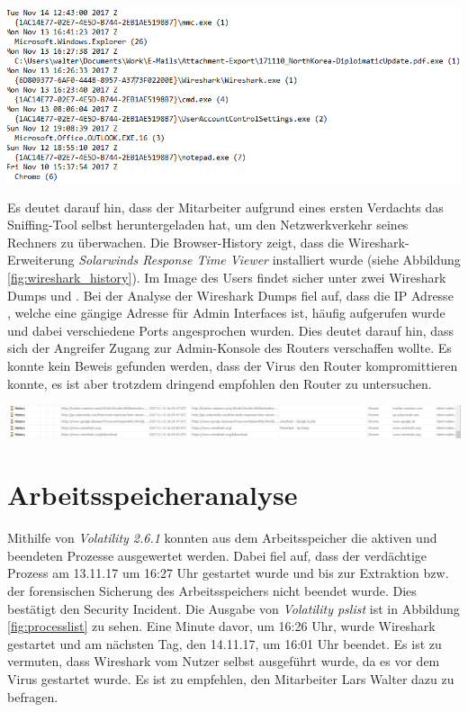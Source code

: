 \begin{center}
	\includegraphics[width=15.8cm]{figures/wireshark_paths.png}
	\label{fig:wireshark_paths}
\end{center}

Es deutet darauf hin, dass der Mitarbeiter aufgrund eines ersten Verdachts das Sniffing-Tool selbst heruntergeladen hat, um den Netzwerkverkehr seines Rechners zu überwachen.
Die Browser-History zeigt, dass die Wireshark-Erweiterung \textit{Solarwinds Response Time Viewer} installiert wurde (siehe Abbildung \ref{fig:wireshark_history}).
Im Image des Users findet sicher unter  zwei Wireshark Dumps  und .
Bei der Analyse der Wireshark Dumps fiel auf, dass die IP Adresse , welche eine gängige Adresse für Admin Interfaces ist, häufig aufgerufen wurde und dabei verschiedene Ports angesprochen wurden.
Dies deutet darauf hin, dass sich der Angreifer Zugang zur Admin-Konsole des Routers verschaffen wollte.
Es konnte kein Beweis gefunden werden, dass der Virus den Router kompromittieren konnte, es ist aber trotzdem dringend empfohlen den Router zu untersuchen.

\begin{center}
	\includegraphics[width=15.8cm]{figures/wireshark_history.PNG}
	\label{fig:wireshark_history}
\end{center}

\section{Arbeitsspeicheranalyse}
Mithilfe von \textit{Volatility 2.6.1} konnten aus dem Arbeitsspeicher die aktiven und beendeten Prozesse ausgewertet werden.
Dabei fiel auf, dass der verdächtige Prozess  am 13.11.17 um 16:27 Uhr gestartet wurde und bis zur Extraktion bzw. der forensischen Sicherung des Arbeitsspeichers nicht beendet wurde.
Dies bestätigt den Security Incident. Die Ausgabe von \textit{Volatility pslist} ist in Abbildung \ref{fig:processlist} zu sehen.
Eine Minute davor, um 16:26 Uhr, wurde Wireshark gestartet und am nächsten Tag, den 14.11.17, um 16:01 Uhr beendet.
Es ist zu vermuten, dass Wireshark vom Nutzer selbst ausgeführt wurde, da es vor dem Virus gestartet wurde.
Es ist zu empfehlen, den Mitarbeiter Lars Walter dazu zu befragen.

